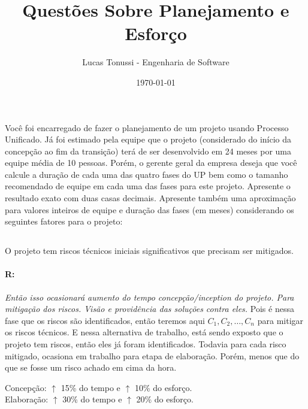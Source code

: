 \documentclass[10pt, a4paper]{report}
\title{Questões Sobre Planejamento e Esforço}
\author{Lucas Tonussi - Engenharia de Software}
\date{\today}
\begin{document}
\maketitle
\tableofcontents
\listoftables
\pagebreak

\section{}
\qquad Você foi encarregado de fazer o planejamento de um projeto usando
Processo Unificado. Já foi estimado pela equipe que o projeto (considerado do
início da concepção ao fim da transição) terá de ser desenvolvido em 24 meses
por uma equipe média de 10 pessoas. Porém, o gerente geral da empresa deseja que
você calcule a duração de cada uma das quatro fases do UP bem como o tamanho
recomendado de equipe em cada uma das fases para este projeto. Apresente o
resultado exato com duas casas decimais. Apresente também uma aproximação para
valores inteiros de equipe e duração das fases (em meses) considerando os
seguintes fatores para o projeto:

\subsection{}
\qquad O projeto tem riscos técnicos iniciais significativos que precisam ser
mitigados.

\paragraph{R:}

\textit{Então isso ocasionará aumento do tempo concepção/inception do projeto.
Para mitigação dos riscos. Visão e providência das soluções contra eles.} Pois é
nessa fase que os riscos são identificados, então teremos aqui $C_1, C_2, \dots,
C_n$ para mitigar os riscos técnicos. E nessa alternativa de trabalho, está
sendo exposto que o projeto tem riscos, então eles já foram identificados.
Todavia para cada risco mitigado, ocasiona em trabalho para etapa de elaboração.
Porém, menos que do que se fosse um risco achado em cima da hora.

\begin{center}
  \begin{Large}
    Concepção: $\uparrow$ 15\% do tempo e $\uparrow$ 10\% do esforço.\\
    Elaboração: $\uparrow$ 30\% do tempo e $\uparrow$ 20\% do esforço.
  \end{Large}
\end{center}
\end{document}
